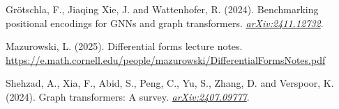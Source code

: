 \begin{bookreferences}
\item Grötschla, F., Jiaqing Xie, J. and Wattenhofer, R. (2024).
  Benchmarking positional encodings for GNNs and graph transformers.
  \href{https://arxiv.org/abs/2411.12732}{\emph{arXiv:2411.12732}}.
\item Mazurowski, L. (2025). Differential forms lecture notes.
  \url{https://e.math.cornell.edu/people/mazurowski/DifferentialFormsNotes.pdf}
\item Shehzad, A., Xia, F., Abid, S., Peng, C., Yu, S., Zhang, D. and Verspoor, K. (2024).
  Graph transformers: A survey. \href{https://arxiv.org/abs/2407.09777}{\emph{arXiv:2407.09777}}.
\end{bookreferences}
